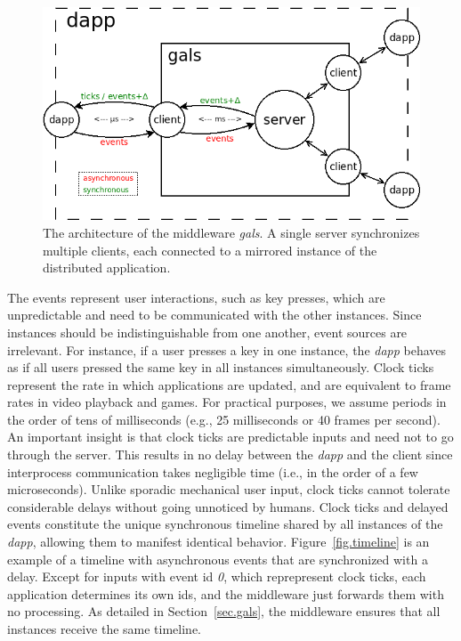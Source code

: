 \documentclass[sigplan,screen]{acmart}
\newcommand{\dapp}{\emph{dapp}\xspace}
\begin{document}
\begin{figure}[t]
  \centering
  \includegraphics[width=\linewidth]{middleware}
  \caption{
    \label{fig.middleware}
    The architecture of the middleware \emph{gals}.
    A single server synchronizes multiple clients, each connected to a mirrored
    instance of the distributed application.
  }
\end{figure}

The events represent user interactions, such as key presses, which are
unpredictable and need to be communicated with the other instances.
Since instances should be indistinguishable from one another, event sources are
irrelevant.
For instance, if a user presses a key in one instance, the \dapp behaves as if
all users pressed the same key in all instances simultaneously.
%
Clock ticks represent the rate in which applications are updated, and are
equivalent to frame rates in video playback and games.
For practical purposes, we assume periods in the order of tens of milliseconds
(e.g., 25 milliseconds or 40 frames per second).
An important insight is that clock ticks are predictable inputs and need not to
go through the server.
This results in no delay between the \dapp and the client since interprocess
communication takes negligible time (i.e., in the order of a few microseconds).
Unlike sporadic mechanical user input, clock ticks cannot tolerate considerable
delays without going unnoticed by humans.
%
Clock ticks and delayed events constitute the unique synchronous timeline
shared by all instances of the \dapp, allowing them to manifest identical
behavior.
Figure~\ref{fig.timeline} is an example of a timeline with asynchronous events
that are synchronized with a delay.
Except for inputs with event id \emph{0}, which reprepresent clock ticks, each
application determines its own ids, and the middleware just forwards them with
no processing.
As detailed in Section~\ref{sec.gals}, the middleware ensures that all
instances receive the same timeline.
\end{document}
